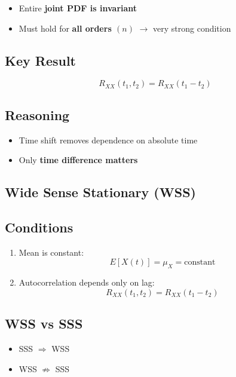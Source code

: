 \documentclass[12pt]{article}
\begin{document}
\begin{itemize}
\item Entire \textbf{joint PDF is invariant}
\item Must hold for \textbf{all orders $(n)$} $\rightarrow$ very strong condition
\end{itemize}

\subsection*{Key Result}

\[
R_{XX}(t_1,t_2) = R_{XX}(t_1 - t_2)
\]

\subsection*{Reasoning}

\begin{itemize}
\item Time shift removes dependence on absolute time
\item Only \textbf{time difference matters}
\end{itemize}

\subsection*{Wide Sense Stationary (WSS)}

\subsection*{Conditions}

\begin{enumerate}
\item Mean is constant:
\[
E[X(t)] = \mu_X = \text{constant}
\]

\item Autocorrelation depends only on lag:
\[
R_{XX}(t_1,t_2) = R_{XX}(t_1 - t_2)
\]
\end{enumerate}

\subsection*{WSS vs SSS}

\begin{itemize}
\item SSS $\Rightarrow$ WSS
\item WSS $\nRightarrow$ SSS
\end{itemize}
\end{document}
